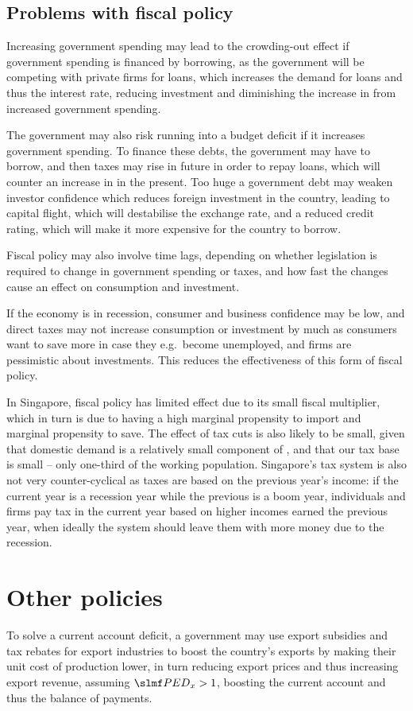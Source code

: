 \documentclass[Economics.tex]{subfiles}
\begin{document}
\subsection{Problems with fiscal policy}
Increasing government spending may lead to the crowding-out effect if government spending is financed by borrowing, as the government will be competing with private firms for loans, which increases the demand for loans and thus the interest rate, reducing investment and diminishing the increase in \AD{} from increased government spending.

The government may also risk running into a budget deficit if it increases government spending. To finance these debts, the government may have to borrow, and then taxes may rise in future in order to repay loans, which will counter an increase in \AD{} in the present. Too huge a government debt may weaken investor confidence which reduces foreign investment in the country, leading to capital flight, which will destabilise the exchange rate, and a reduced credit rating, which will make it more expensive for the country to borrow.

Fiscal policy may also involve time lags, depending on whether legislation is required to change in government spending or taxes, and how fast the changes cause an effect on consumption and investment.

If the economy is in recession, consumer and business confidence may be low, and direct taxes may not increase consumption or investment by much as consumers want to save more in case they e.g.\ become unemployed, and firms are pessimistic about investments. This reduces the effectiveness of this form of fiscal policy.

In Singapore, fiscal policy has limited effect due to its small fiscal multiplier, which in turn is due to having a high marginal propensity to import and marginal propensity to save. The effect of tax cuts is also likely to be small, given that domestic demand is a relatively small component of \AD{}, and that our tax base is small -- only one-third of the working population. Singapore's tax system is also not very counter-cyclical as taxes are based on the previous year's income: if the current year is a recession year while the previous is a boom year, individuals and firms pay tax in the current year based on higher incomes earned the previous year, when ideally the system should leave them with more money due to the recession.
\section{Other policies}
To solve a current account deficit, a government may use export subsidies and tax rebates for export industries to boost the country's exports by making their unit cost of production lower, in turn reducing export prices and thus increasing export revenue, assuming \(\PEDx{} > 1\), boosting the current account and thus the balance of payments.
\end{document}
